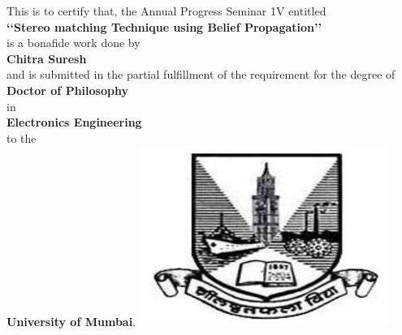 \begin{center}
\large This is to certify that, the Annual Progress Seminar 1V entitled
\vspace{0.15in}\\\textbf {\lq\lq Stereo matching Technique using Belief Propagation\rq\rq} \\
\vspace{0.1in}is a bonafide work done by\vspace{0.15in}
\\\textbf { Chitra Suresh } \\
and is submitted in the partial fulfillment of
the requirement for the degree of \vspace{0.15in} \\\textbf{Doctor  of Philosophy}\\
in \\\textbf{Electronics  Engineering} \\to the \\\textbf{University of Mumbai}.
\includegraphics{university.eps}\\

\vspace{0.2in}
%
%
%
\begin{tabular}{ccc}


\end{tabular}
\end{center}
